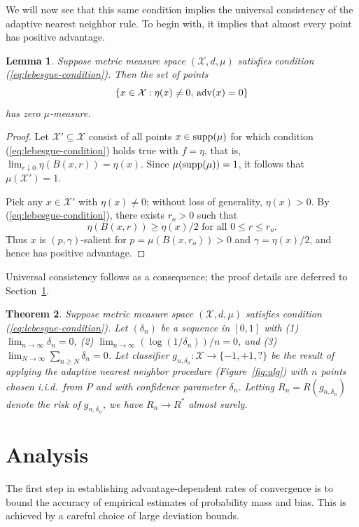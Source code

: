 \documentclass{article}
\def\X{{\mathcal X}}
\def\supp{{\rm supp}}
\def\adv{{\rm adv}}
\newtheorem{theorem}{Theorem}
\newtheorem{lemma}[theorem]{Lemma}
\begin{document}
We will now see that this same condition implies the universal consistency of the adaptive nearest neighbor rule. To begin with, it implies that almost every point has positive advantage.
\begin{lemma}
Suppose metric measure space $(\X, d, \mu)$ satisfies condition (\ref{eq:lebesgue-condition}). Then the set of points
$$ \{x \in \X: \eta(x) \neq 0, \, \adv(x) = 0\}$$
has zero $\mu$-measure.
\label{lemma:positive-advantage}
\end{lemma}
\begin{proof}
Let $\X' \subseteq \X$ consist of all points $x \in \supp(\mu)$ for which condition (\ref{eq:lebesgue-condition}) holds true with $f=\eta$, that is, $\lim_{r \downarrow 0} \eta(B(x,r)) = \eta(x)$. 
Since $\mu(\supp(\mu))=1$, it follows that $\mu(\X') = 1$. 

Pick any $x \in \X'$ with $\eta(x) \neq 0$; without loss of generality, $\eta(x) > 0$. By (\ref{eq:lebesgue-condition}), there exists $r_o > 0$ such that
$$\eta(B(x,r)) \geq \eta(x)/2 \mbox{\  for all \ } 0 \leq r \leq r_o.$$
Thus $x$ is $(p,\gamma)$-salient for $p = \mu(B(x,r_o)) > 0$ and $\gamma = \eta(x)/2$, and hence has positive advantage.
\end{proof}

Universal consistency follows as a consequence; the proof details are deferred to Section~\ref{sec:proof-outline}.
\begin{theorem}
Suppose metric measure space $(\X, d, \mu)$ satisfies condition (\ref{eq:lebesgue-condition}). Let $(\delta_n)$ be a sequence in $[0,1]$ with (1) $\lim_{n \rightarrow \infty} \delta_n = 0$, (2) $\lim_{n \rightarrow \infty} (\log (1/\delta_n))/n = 0$, and (3) $\lim_{N \rightarrow \infty} \sum_{n \geq N} \delta_n = 0$. Let classifier $g_{n, \delta_n}: \X \rightarrow \{-1,+1,?\}$ be the result of applying the adaptive nearest neighbor procedure (Figure~\ref{fig:alg}) with $n$ points chosen i.i.d.\ from $P$ and with confidence parameter $\delta_n$. Letting $R_n = R(g_{n,\delta_n})$ denote the risk of $g_{n,\delta_n}$, we have $R_n \rightarrow R^*$ almost surely.
\label{thm:universal-consistency}
\end{theorem}

\section{Analysis}
\label{sec:proof-outline}

The first step in establishing advantage-dependent rates of convergence is to bound the accuracy of empirical estimates of probability mass and bias. This is achieved by a careful choice of large deviation bounds.
\end{document}
